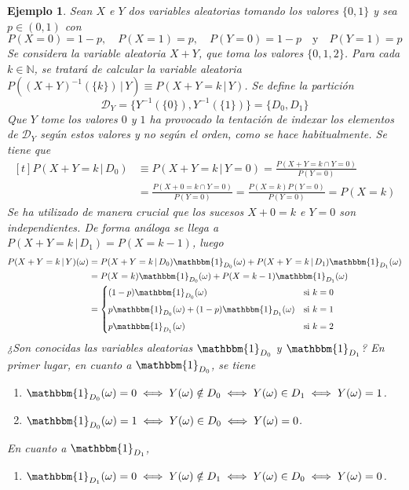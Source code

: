 \documentclass[11pt]{report}
\theoremstyle{mytheorem}
\theoremstyle{mydefinition}
\theoremstyle{myexample}
\newtheorem*{example}{Ejemplo}
\newcommand{\N}{\mathbb N}
\begin{document}
\begin{example}
Sean $X$ e $Y$ dos variables aleatorias tomando los valores $\{0,1\}$ y sea $p \in (0,1)$ con
\[P(X=0) = 1-p, \quad P(X=1) = p, \quad P(Y=0) = 1-p \quad \text{y} \quad P(Y=1) = p\]
Se considera la variable aleatoria $X+Y$, que toma los valores $\{0,1,2\}$. Para cada $k \in \N$, se tratará de calcular la variable aleatoria $P((X+Y)^{-1}(\{k\}) \, | \, Y) \equiv P(X+Y=k \, | \, Y)$. Se define la partición
\[\mathcal{D}_Y = \{Y^{-1}(\{0\}),Y^{-1}(\{1\})\} = \{D_0,D_1\}\]
Que $Y$ tome los valores $0$ y $1$ ha provocado la tentación de indexar los elementos de $\mathcal{D}_Y$ según estos valores y no según el orden, como se hace habitualmente. Se tiene que
\[
\begin{aligned}[t]
P(X+Y =k \, | \, D_0) &\equiv P(X+Y =k \, | \, Y=0) = \frac{P(X+Y=k \cap Y=0)}{P(Y=0)} \\[5pt]
&= \frac{P(X+0=k \cap Y=0)}{P(Y=0)} = \frac{P(X=k)P(Y=0)}{P(Y=0)} =P(X=k)
\end{aligned}
\]
Se ha utilizado de manera crucial que los sucesos $X+0=k$ e $Y=0$ son independientes. De forma análoga se llega a $P(X+Y=k \, | \, D_1) = P(X=k-1)$, luego
\[
\begin{aligned}[t]
P(X+Y =k \, | \, Y)(\omega) &= P(X+Y=k \, | \, D_0) \mathbbm{1}_{D_0}(\omega) +  P(X+Y=k \, | \, D_1) \mathbbm{1}_{D_1}(\omega) \\
&= P(X=k)\mathbbm{1}_{D_0}(\omega)+P(X=k-1)\mathbbm{1}_{D_1}(\omega) \\
&= \begin{cases}
    (1-p)\mathbbm{1}_{D_0}(\omega) & $si$ \ k= 0 \\[5pt]
    p\mathbbm{1}_{D_0}(\omega)+(1-p)\mathbbm{1}_{D_1}(\omega) & $si$ \ k = 1 \\[5pt]
    p\mathbbm{1}_{D_1}(\omega) & $si$ \ k =2
\end{cases}
\end{aligned}
\]
¿Son conocidas las variables aleatorias $\mathbbm{1}_{D_0}$ y $\mathbbm{1}_{D_1}$? En primer lugar, en cuanto a $\mathbbm{1}_{D_0}$, se tiene
\begin{enumerate}
    \item $\mathbbm{1}_{D_0}(\omega) = 0 \iff Y(\omega) \notin D_0 \iff Y(\omega) \in D_1 \iff Y(\omega) = 1$.
    \item $\mathbbm{1}_{D_0}(\omega) = 1 \iff Y(\omega) \in D_0 \iff Y(\omega) =0$.
\end{enumerate}
En cuanto a $\mathbbm{1}_{D_1}$,
\begin{enumerate}
    \item $\mathbbm{1}_{D_1}(\omega) = 0 \iff Y(\omega) \notin D_1 \iff Y(\omega) \in D_0 \iff Y(\omega) = 0$.

\end{enumerate}
\end{example}
\end{document}

